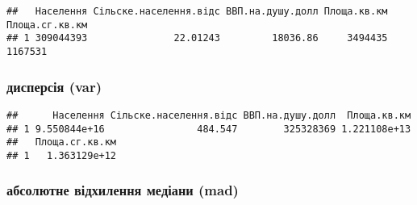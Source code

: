 \documentclass[
]{article}
\newenvironment{Shaded}{\begin{snugshade}}{\end{snugshade}}
\newcommand{\CommentTok}[1]{\textcolor[rgb]{0.56,0.35,0.01}{\textit{#1}}}
\newcommand{\DataTypeTok}[1]{\textcolor[rgb]{0.13,0.29,0.53}{#1}}
\newcommand{\KeywordTok}[1]{\textcolor[rgb]{0.13,0.29,0.53}{\textbf{#1}}}
\newcommand{\NormalTok}[1]{#1}
\newcommand{\OperatorTok}[1]{\textcolor[rgb]{0.81,0.36,0.00}{\textbf{#1}}}
\newcommand{\OtherTok}[1]{\textcolor[rgb]{0.56,0.35,0.01}{#1}}
\newcommand{\StringTok}[1]{\textcolor[rgb]{0.31,0.60,0.02}{#1}}
\begin{document}
\begin{verbatim}
##   Населення Сільске.населення.відс ВВП.на.душу.долл Площа.кв.км Площа.сг.кв.км
## 1 309044393               22.01243         18036.86     3494435        1167531
\end{verbatim}

\hypertarget{ux434ux438ux441ux43fux435ux440ux441ux456ux44f-var}{%
\subsubsection{дисперсія
(var)}\label{ux434ux438ux441ux43fux435ux440ux441ux456ux44f-var}}

\begin{Shaded}
\end{Shaded}

\begin{verbatim}
##      Населення Сільске.населення.відс ВВП.на.душу.долл  Площа.кв.км
## 1 9.550844e+16                484.547        325328369 1.221108e+13
##   Площа.сг.кв.км
## 1   1.363129e+12
\end{verbatim}

\hypertarget{ux430ux431ux441ux43eux43bux44eux442ux43dux435-ux432ux456ux434ux445ux438ux43bux435ux43dux43dux44f-ux43cux435ux434ux456ux430ux43dux438-mad}{%
\subsubsection{абсолютне відхилення медіани
(mad)}\label{ux430ux431ux441ux43eux43bux44eux442ux43dux435-ux432ux456ux434ux445ux438ux43bux435ux43dux43dux44f-ux43cux435ux434ux456ux430ux43dux438-mad}}
\end{document}
